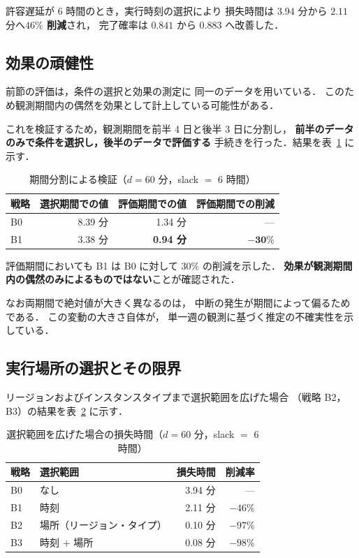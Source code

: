 \documentclass[11pt,a4paper]{ltjsreport}
\begin{document}
許容遅延が 6 時間のとき，実行時刻の選択により
損失時間は $3.94$ 分から $2.11$ 分へ\textbf{$46\%$ 削減}され，
完了確率は $0.841$ から $0.883$ へ改善した．

\subsection{効果の頑健性}
\label{sec:holdout}

前節の評価は，条件の選択と効果の測定に
同一のデータを用いている．
このため観測期間内の偶然を効果として計上している可能性がある．

これを検証するため，観測期間を前半 4 日と後半 3 日に分割し，
\textbf{前半のデータのみで条件を選択し，後半のデータで評価する}
手続きを行った．結果を表~\ref{tab:holdout} に示す．

\begin{table}[htbp]
\centering
\caption{期間分割による検証（$d = 60$ 分，slack $=$ 6 時間）}
\label{tab:holdout}
\small
\begin{tabular}{@{}lrrr@{}}
\toprule
戦略 & 選択期間での値 & \textbf{評価期間での値} & 評価期間での削減 \\
\midrule
B0 & 8.39 分 & 1.34 分 & --- \\
B1 & 3.38 分 & \textbf{0.94 分} & $\mathbf{-30\%}$ \\
\bottomrule
\end{tabular}
\end{table}

評価期間においても B1 は B0 に対して $30\%$ の削減を示した．
\textbf{効果が観測期間内の偶然のみによるものではない}ことが確認された．

なお両期間で絶対値が大きく異なるのは，
中断の発生が期間によって偏るためである．
この変動の大きさ自体が，
単一週の観測に基づく推定の不確実性を示している．

\subsection{実行場所の選択とその限界}
\label{sec:b2_limit}

リージョンおよびインスタンスタイプまで選択範囲を広げた場合
（戦略 B2，B3）の結果を表~\ref{tab:b2_result} に示す．

\begin{table}[htbp]
\centering
\caption{選択範囲を広げた場合の損失時間（$d = 60$ 分，slack $=$ 6 時間）}
\label{tab:b2_result}
\small
\begin{tabular}{@{}llrr@{}}
\toprule
戦略 & 選択範囲 & 損失時間 & 削減率 \\
\midrule
B0 & なし & 3.94 分 & --- \\
B1 & 時刻 & 2.11 分 & $-46\%$ \\
B2 & 場所（リージョン・タイプ） & 0.10 分 & $-97\%$ \\
B3 & 時刻 $+$ 場所 & 0.08 分 & $-98\%$ \\
\bottomrule
\end{tabular}
\end{table}
\end{document}
